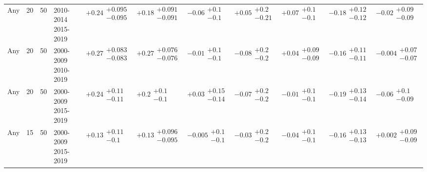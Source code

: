 \begin{table}[H]
\begin{tabular}{lrrllllllll}
Any & 20 & 50 & \makecell{2010-2014 \\ 2015-2019} & $\bm{+0.24}\substack{+0.095 \\ -0.095}$ & $\bm{+0.18}\substack{+0.091 \\ -0.091}$ & $-0.06\substack{+0.1 \\ -0.1}$ & $+0.05\substack{+0.2 \\ -0.21}$ & $+0.07\substack{+0.1 \\ -0.1}$ & $\bm{-0.18}\substack{+0.12 \\ -0.12}$ & $-0.02\substack{+0.09 \\ -0.09}$ \\
Any & 20 & 50 & \makecell{2000-2009 \\ 2010-2019} & $\bm{+0.27}\substack{+0.083 \\ -0.083}$ & $\bm{+0.27}\substack{+0.076 \\ -0.076}$ & $-0.01\substack{+0.1 \\ -0.1}$ & $-0.08\substack{+0.2 \\ -0.2}$ & $+0.04\substack{+0.09 \\ -0.09}$ & $\bm{-0.16}\substack{+0.11 \\ -0.11}$ & $-0.004\substack{+0.07 \\ -0.07}$ \\
Any & 20 & 50 & \makecell{2000-2009 \\ 2015-2019} & $\bm{+0.24}\substack{+0.11 \\ -0.11}$ & $\bm{+0.2}\substack{+0.1 \\ -0.1}$ & $+0.03\substack{+0.15 \\ -0.14}$ & $-0.07\substack{+0.2 \\ -0.2}$ & $-0.01\substack{+0.1 \\ -0.1}$ & $\bm{-0.19}\substack{+0.13 \\ -0.14}$ & $-0.06\substack{+0.1 \\ -0.09}$ \\
Any & 15 & 50 & \makecell{2000-2009 \\ 2015-2019} & $\bm{+0.13}\substack{+0.11 \\ -0.1}$ & $\bm{+0.13}\substack{+0.096 \\ -0.095}$ & $-0.005\substack{+0.1 \\ -0.1}$ & $-0.03\substack{+0.2 \\ -0.2}$ & $-0.04\substack{+0.1 \\ -0.1}$ & $\bm{-0.16}\substack{+0.13 \\ -0.13}$ & $+0.002\substack{+0.09 \\ -0.09}$ \\

\end{tabular}
\end{table}
